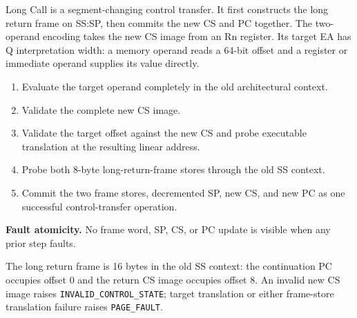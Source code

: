Long Call is a segment-changing control transfer. It first constructs the long return frame on SS:SP, then commits the new CS and PC together. The two-operand encoding takes the new CS image from an Rn register. Its target EA has Q interpretation width: a memory operand reads a 64-bit offset and a register or immediate operand supplies its value directly.

\begin{enumerate}
\item Evaluate the target operand completely in the old architectural context.
\item Validate the complete new CS image.
\item Validate the target offset against the new CS and probe executable translation at the resulting linear address.
\item Probe both 8-byte long-return-frame stores through the old SS context.
\item Commit the two frame stores, decremented SP, new CS, and new PC as one successful control-transfer operation.
\end{enumerate}

\textbf{Fault atomicity.} No frame word, SP, CS, or PC update is visible when any prior step faults.

The long return frame is 16 bytes in the old SS context: the continuation PC occupies offset 0 and the return CS image
occupies offset 8. An invalid new CS image raises \texttt{INVALID\_CONTROL\_STATE}; target translation or either
frame-store translation failure raises \texttt{PAGE\_FAULT}.
